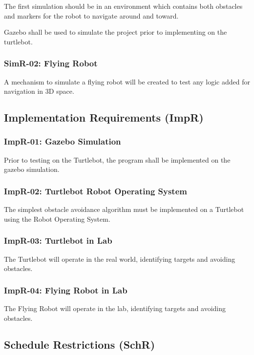\documentclass{article}
\begin{document}
		The first simulation should be in an environment which contains both obstacles and markers for the robot to navigate around and toward.

		Gazebo shall be used to simulate the project prior to implementing on the turtlebot.
		
		\subsubsection{SimR-02: Flying Robot}
		
		A mechanism to simulate a flying robot will be created to test any logic added for navigation in 3D space.
		
	
	\subsection{Implementation Requirements (ImpR)}
	
		\subsubsection{ImpR-01: Gazebo Simulation}
		
		Prior to testing on the Turtlebot, the program shall be implemented on the gazebo simulation.
		
		\subsubsection{ImpR-02: Turtlebot Robot Operating System}
		
		The simplest obstacle avoidance algorithm must be implemented on a Turtlebot using the Robot Operating System.
		
		\subsubsection{ImpR-03: Turtlebot in Lab}
		
		The Turtlebot will operate in the real world, identifying targets and avoiding obstacles. 
		
		\subsubsection{ImpR-04: Flying Robot in Lab}
		
		The Flying Robot will operate in the lab, identifying targets and avoiding obstacles.
		
	\subsection{Schedule Restrictions (SchR)}
	
\end{document}
